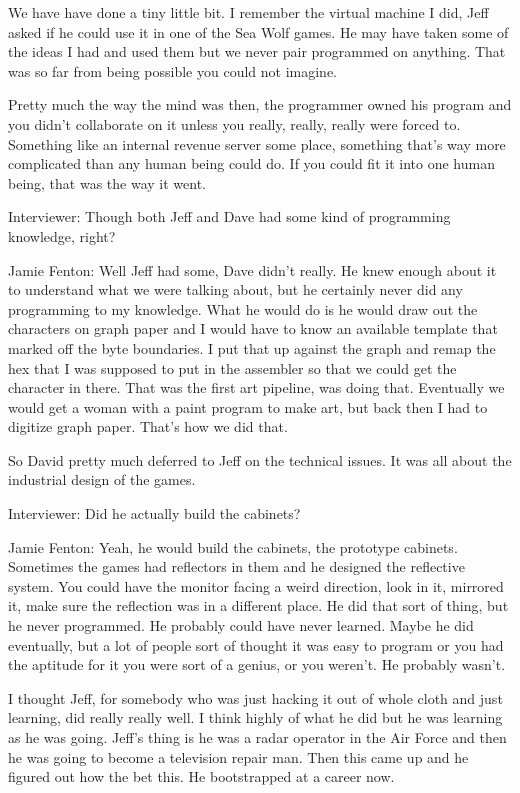 We have have done a tiny little bit. I remember the virtual machine I did, Jeff asked if he could use it in one of the Sea Wolf games. He may have taken some of the ideas I had and used them but we never pair programmed on anything. That was so far from being possible you could not imagine. 

Pretty much the way the mind was then, the programmer owned his program and you didn’t collaborate on it unless you really, really, really were forced to. Something like an internal revenue server some place, something that’s way more complicated than any human being could do. If you could fit it into one human being, that was the way it went.

\textcolor{interviewer}{Interviewer:} Though both Jeff and Dave had some kind of programming knowledge, right?

\textcolor{interviewee}{Jamie Fenton:} Well Jeff had some, Dave didn’t really. He knew enough about it to understand what we were talking about, but he certainly never did any programming to my knowledge. What he would do is he would draw out the characters on graph paper and I would have to know an available template that marked off the byte boundaries. I put that up against the graph and remap the hex that I was supposed to put in the assembler so that we could get the character in there. That was the first art pipeline, was doing that. Eventually we would get a woman with a paint program to make art, but back then I had to digitize graph paper. That’s how we did that.

So David pretty much deferred to Jeff on the technical issues. It was all about the industrial design of the games.

\textcolor{interviewer}{Interviewer:} Did he actually build the cabinets?

\textcolor{interviewee}{Jamie Fenton:} Yeah, he would build the cabinets, the prototype cabinets. Sometimes the games had reflectors in them and he designed the reflective system. You could have the monitor facing a weird direction, look in it, mirrored it, make sure the reflection was in a different place. He did that sort of thing, but he never programmed. He probably could have never learned. Maybe he did eventually, but a lot of people sort of thought it was easy to program or you had the aptitude for it you were sort of a genius, or you weren’t. He probably wasn’t.

I thought Jeff, for somebody who was just hacking it out of whole cloth and just learning, did really really well. I think highly of what he did but he was learning as he was going. Jeff’s thing is he was a radar operator in the Air Force and then he was going to become a television repair man. Then this came up and he figured out how the bet this. He bootstrapped at a career now.

